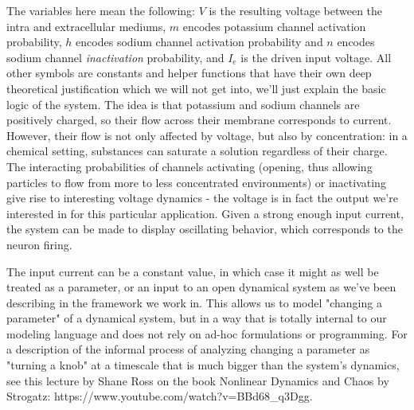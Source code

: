 The variables here mean the following: $V$ is the resulting voltage between the intra and extracellular mediums, $m$ encodes potassium channel activation probability, $h$ encodes sodium channel activation probability and $n$ encodes sodium channel \textit{inactivation} probability, and $I_e$ is the driven input voltage. All other symbols are constants and helper functions that have their own deep theoretical justification which we will not get into, we'll just explain the basic logic of the system. The idea is that potassium and sodium channels are positively charged, so their flow across their membrane corresponds to current. However, their flow is not only affected by voltage, but also by concentration: in a chemical setting, substances can saturate a solution regardless of their charge. The interacting probabilities of channels activating (opening, thus allowing particles to flow from more to less concentrated environments) or inactivating give rise to interesting voltage dynamics - the voltage is in fact the output we're interested in for this particular application. Given a strong enough input current, the system can be made to display oscillating behavior, which corresponds to the neuron firing.

The input current can be a constant value, in which case it might as well be treated as a parameter, or an input to an open dynamical system as we've been describing in the framework we work in. This allows us to model "changing a parameter" of a dynamical system, but in a way that is totally internal to our modeling language and does not rely on ad-hoc formulations or programming. For a description of the informal process of analyzing changing a parameter as "turning a knob" at a timescale that is much bigger than the system's dynamics, see this lecture by Shane Ross on the book Nonlinear Dynamics and Chaos by Strogatz: https://www.youtube.com/watch?v=BBd68\_q3Dgg. 


